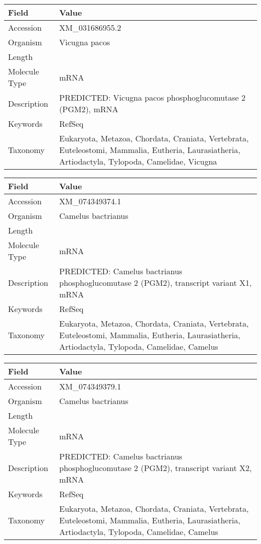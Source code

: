 \documentclass[10pt]{article}
\begin{document}
{\footnotesize
\begin{longtable}{>{\raggedright\arraybackslash}p{4.5cm} >{\raggedright\arraybackslash}p{11.5cm}}
\textbf{Field} & \textbf{Value} \\
\hline
Accession & XM\_031686955.2 \\
Organism & Vicugna pacos \\
Length & 2234 \\
Molecule Type & mRNA \\
Description & PREDICTED: Vicugna pacos phosphoglucomutase 2 (PGM2), mRNA \\
Keywords & RefSeq \\
Taxonomy & Eukaryota, Metazoa, Chordata, Craniata, Vertebrata, Euteleostomi, Mammalia, Eutheria, Laurasiatheria, Artiodactyla, Tylopoda, Camelidae, Vicugna \\
\end{longtable}
}

{\footnotesize
\begin{longtable}{>{\raggedright\arraybackslash}p{4.5cm} >{\raggedright\arraybackslash}p{11.5cm}}
\textbf{Field} & \textbf{Value} \\
\hline
Accession & XM\_074349374.1 \\
Organism & Camelus bactrianus \\
Length & 4924 \\
Molecule Type & mRNA \\
Description & PREDICTED: Camelus bactrianus phosphoglucomutase 2 (PGM2), transcript variant X1, mRNA \\
Keywords & RefSeq \\
Taxonomy & Eukaryota, Metazoa, Chordata, Craniata, Vertebrata, Euteleostomi, Mammalia, Eutheria, Laurasiatheria, Artiodactyla, Tylopoda, Camelidae, Camelus \\
\end{longtable}
}

{\footnotesize
\begin{longtable}{>{\raggedright\arraybackslash}p{4.5cm} >{\raggedright\arraybackslash}p{11.5cm}}
\textbf{Field} & \textbf{Value} \\
\hline
Accession & XM\_074349379.1 \\
Organism & Camelus bactrianus \\
Length & 4841 \\
Molecule Type & mRNA \\
Description & PREDICTED: Camelus bactrianus phosphoglucomutase 2 (PGM2), transcript variant X2, mRNA \\
Keywords & RefSeq \\
Taxonomy & Eukaryota, Metazoa, Chordata, Craniata, Vertebrata, Euteleostomi, Mammalia, Eutheria, Laurasiatheria, Artiodactyla, Tylopoda, Camelidae, Camelus \\
\end{longtable}
}
\end{document}
